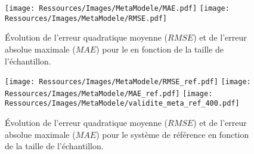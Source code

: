 
\begin{figure}
    \centering
    \texttt{[image: Ressources/Images/MetaModele/MAE.pdf]}
    \texttt{[image: Ressources/Images/MetaModele/RMSE.pdf]}
    \caption[Évolution de la fidélité des méta-modèles pour le ]
            {Évolution de l’erreur quadratique moyenne ($RMSE$) et de l’erreur absolue
             maximale ($MAE$) pour le  en fonction de la taille de
             l’échantillon.}
    \label{fig:mae_rmse_ssc}
\end{figure}

\begin{figure}
    \centering
    \texttt{[image: Ressources/Images/MetaModele/RMSE\_ref.pdf]}
    \texttt{[image: Ressources/Images/MetaModele/MAE\_ref.pdf]}
    \texttt{[image: Ressources/Images/MetaModele/validite\_meta\_ref\_400.pdf]}
    \caption[Évolution de la fidélité du méta-modèle pour le système de référence]
            {Évolution de l’erreur quadratique moyenne ($RMSE$) et de l’erreur absolue
             maximale ($MAE$) pour le système de référence en fonction de la taille de
             l’échantillon.}
    \label{fig:mae_rmse_qualite_ref}
\end{figure}

